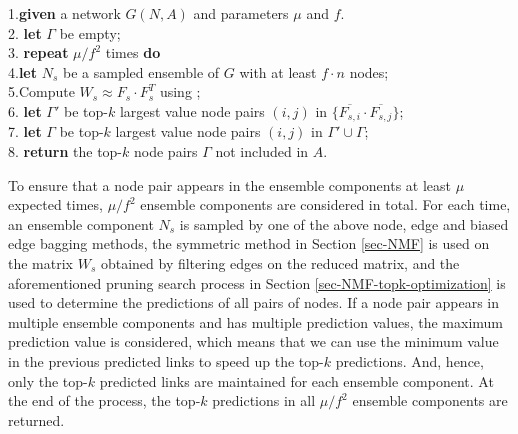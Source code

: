 \begin{tabbing}1.\hspace{1ex}\=
 {\bf given} a network $G(N, A)$ and parameters $\mu$ and $f$.\\
2.\> {\bf let} $\Gamma$ be empty;\\
3.\> {\bf repeat} $\mu/f^2$  times {\bf do} \\
4.\>\hspace{2ex}\= {\bf let} $N_s$ be a sampled ensemble of $G$ with at least $f\cdot n$ nodes; \\
5.\>\>Compute $W_s \approx F_s\cdot F_s^T$ using \NMF; \\
6.\>\> {\bf let} $\Gamma'$ be top-$k$ largest value node pairs $(i,j)$ in $\{\overline{F_{s,i}} \cdot \overline{F_{s,j}}\}$;\\
7.\>\> {\bf let} $\Gamma$ be top-$k$ largest value node pairs $(i,j)$ in $\Gamma'\cup\Gamma$;\\
8.\> {\bf return} the top-$k$ node pairs $\Gamma$ not included in $A$.
\end{tabbing}


To ensure that a node pair appears in the ensemble components at least $\mu$ expected times,  $\mu / f^{2}$ ensemble components are considered in total.
For each time, an ensemble component $N_s$ is sampled by one of the above
node, edge and biased edge bagging methods, the symmetric \NMF method in Section \ref{sec-NMF} is used on the matrix $W_s$ obtained
by filtering edges on the reduced matrix, and the aforementioned
pruning search process in Section \ref{sec-NMF-topk-optimization} is used to determine the predictions of
all pairs of nodes. If a node pair appears in multiple ensemble components and has multiple
prediction values, the maximum prediction value is considered, which means that we can use the
minimum value in the previous predicted links to speed up the top-$k$ predictions.
And, hence, only the top-$k$ predicted links are maintained for each ensemble component.
At the end of the process, the top-$k$ predictions in all $\mu / f^{2}$ ensemble components are returned.




